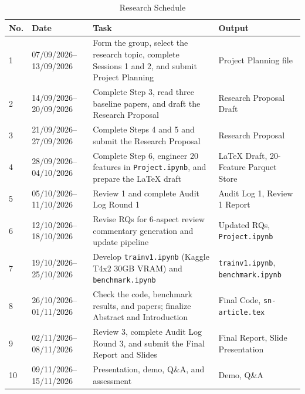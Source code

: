 \documentclass[pdflatex,sn-mathphys-num]{sn-jnl}
\theoremstyle{thmstyleone}
\theoremstyle{thmstyletwo}
\theoremstyle{thmstylethree}
\begin{document}
\begin{table}[htbp]
\centering
\caption{Research Schedule}
\label{tab:researchplan}
\small
\setlength{\tabcolsep}{4pt}
\begin{tabular}{p{}p{}p{}p{}}
\toprule
No. & Date & Task & Output \\
\midrule

1 &
07/09/2026--13/09/2026 &
Form the group, select the research topic, complete Sessions 1 and 2,
and submit Project Planning &
Project Planning file \\

2 &
14/09/2026--20/09/2026 &
Complete Step 3, read three baseline papers, and draft the Research Proposal &
Research Proposal Draft \\

3 &
21/09/2026--27/09/2026 &
Complete Steps 4 and 5 and submit the Research Proposal &
Research Proposal \\

4 &
28/09/2026--04/10/2026 &
Complete Step 6, engineer 20 features in \texttt{Project.ipynb}, and prepare the LaTeX draft &
LaTeX Draft, 20-Feature Parquet Store \\

5 &
05/10/2026--11/10/2026 &
Review 1 and complete Audit Log Round 1 &
Audit Log 1, Review 1 Report \\

6 &
12/10/2026--18/10/2026 &
Revise RQs for 6-aspect review commentary generation and update pipeline &
Updated RQs, \texttt{Project.ipynb} \\

7 &
19/10/2026--25/10/2026 &
Develop \texttt{trainv1.ipynb} (Kaggle T4x2 30GB VRAM) and \texttt{benchmark.ipynb} &
\texttt{trainv1.ipynb}, \texttt{benchmark.ipynb} \\

8 &
26/10/2026--01/11/2026 &
Check the code, benchmark results, and papers; finalize Abstract and Introduction &
Final Code, \texttt{sn-article.tex} \\

9 &
02/11/2026--08/11/2026 &
Review 3, complete Audit Log Round 3, and submit the Final Report and Slides &
Final Report, Slide Presentation \\

10 &
09/11/2026--15/11/2026 &
Presentation, demo, Q\&A, and assessment &
Demo, Q\&A \\

\bottomrule
\end{tabular}
\end{table}
\end{document}
